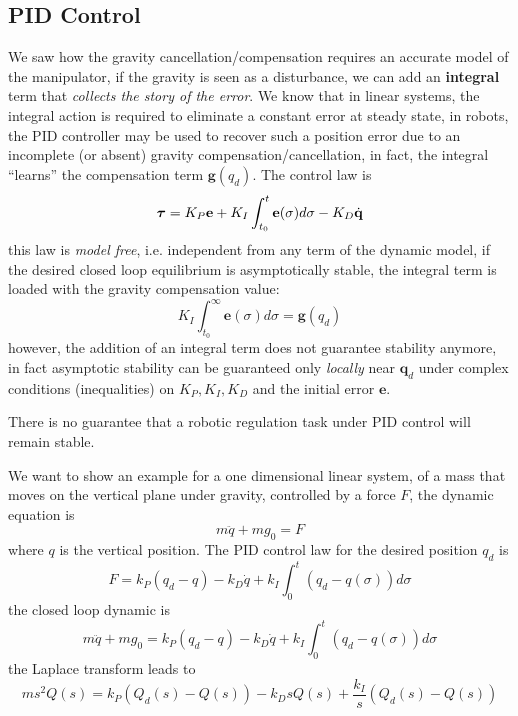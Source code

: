\documentclass[10pt, a4paper]{report}
\newcommand{\q}{{\mathbf q}}
\begin{document}
\subsection{PID Control}
We saw how the gravity cancellation/compensation requires an accurate model of the manipulator, if the gravity is seen as a disturbance, we can add an \textbf{integral} term that \textit{collects the story of the error}. We know that in linear systems, the integral action is required to eliminate a constant error at steady state, in robots, the PID controller may be used to recover such a position error due
to an incomplete (or absent) gravity compensation/cancellation, in fact, the integral ``learns'' the compensation term $\mathbf g(q_d)$. The control law is\begin{equation}
    {\boldsymbol{\tau}}=K_P\mathbf e+K_I\int_{t_0}^t\mathbf e(\sigma)d\sigma-K_D{\dot{\mathbf q}}
\end{equation}
this law is \textit{model free}, i.e. independent from any term of the dynamic model, if the desired closed loop equilibrium is asymptotically stable, the integral term is loaded with the gravity compensation value:\begin{equation}
    K_I\int_{t_0}^\infty\mathbf e(\sigma)d\sigma=\mathbf g(q_d)
\end{equation}
however, the addition of an integral term does not guarantee stability anymore, in fact asymptotic stability can be guaranteed only \textit{locally} near $\q_d$ under complex conditions (inequalities) on $K_P,K_I,K_D$ and the initial error $\mathbf e$.
\begin{boxproposition}{}{}
    There is no guarantee that a robotic regulation task under PID control will remain stable.
\end{boxproposition}
We want to show an example for a one dimensional linear system, of a mass that moves on the vertical plane under gravity, controlled by a force $F$, the dynamic equation is\begin{equation}
    m\ddot q+mg_0=F
\end{equation}
where $q$ is the vertical position. The PID control law for the desired position $q_d$ is\begin{equation}
    F=k_P(q_d-q)-k_D\dot q+k_I\int_0^t(q_d-q(\sigma))d\sigma 
\end{equation}
the closed loop dynamic is\begin{equation}
      m\ddot q+mg_0=k_P(q_d-q)-k_D\dot q+k_I\int_0^t(q_d-q(\sigma))d\sigma 
\end{equation}
the Laplace  transform leads to\begin{equation}
   ms^2Q(s)=k_P(Q_d(s)-Q(s))-k_DsQ(s)+\frac{k_I}{s}(Q_d(s)-Q(s)) 
\end{equation}
\end{document}
